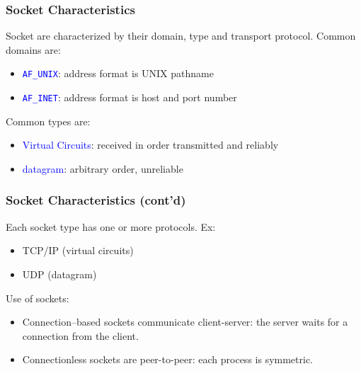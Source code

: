 \documentclass[12pt]{beamer}
\begin{document}
\begin{frame}
	\frametitle{Socket Characteristics}
	{\small Socket are characterized by their domain, type and transport protocol. Common domains are:}
	\begin{itemize}
		\item \textcolor{blue}{\texttt{AF\_UNIX}}: address format is UNIX pathname
		\item \textcolor{blue}{\texttt{AF\_INET}}: address format is host and port number
	\end{itemize}
	\vskip4mm
	{\small Common types are:}
	\begin{itemize}
		\item \textcolor{blue}{Virtual Circuits}: received in order transmitted and reliably
		\item \textcolor{blue}{datagram}: arbitrary order, unreliable
	\end{itemize}
\end{frame}

\begin{frame}
	\frametitle{Socket Characteristics (cont'd)}
	{\small Each socket type has one or more protocols. Ex:}
	\begin{itemize}
		\item TCP/IP (virtual circuits)
		\item UDP (datagram)
	\end{itemize}
	\vskip4mm
	{\small Use of sockets:}
	\begin{itemize}
		\item Connection–based sockets communicate client-server: the server waits for a connection from the client.
		\item Connectionless sockets are peer-to-peer: each process is symmetric.
	\end{itemize}
\end{frame}
\end{document}
